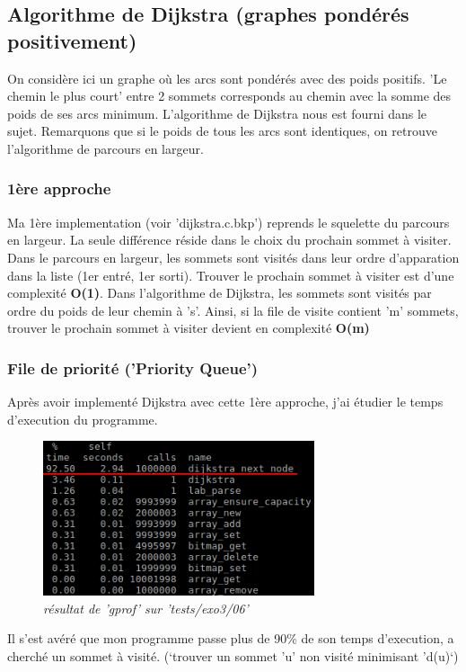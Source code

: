 \documentclass[a4paper,10pt]{article}
\begin{document}
  \subsection{Algorithme de Dijkstra (graphes pondérés positivement)}
    On considère ici un graphe où les arcs sont pondérés avec des poids positifs.\newline
    'Le chemin le plus court' entre 2 sommets corresponds au chemin avec la somme des poids de ses arcs minimum.\newline
     L'algorithme de Dijkstra nous est fourni dans le sujet. Remarquons que si le poids de tous les arcs sont identiques,
     on retrouve l'algorithme de parcours en largeur.
    \subsubsection{1ère approche}
      Ma 1ère implementation (voir 'dijkstra.c.bkp') reprends le squelette du parcours en largeur.
      La seule différence réside dans le choix du prochain sommet à visiter.\newline
      Dans le parcours en largeur, les sommets sont visités dans leur ordre d'apparation dans la liste (1er entré, 1er sorti).
      Trouver le prochain sommet à visiter est d'une complexité \textbf{O(1)}.\newline\newline
      Dans l'algorithme de Dijkstra, les sommets sont visités par ordre du poids de leur chemin à 's'.
      Ainsi, si la file de visite contient 'm' sommets, trouver le prochain sommet à visiter devient en complexité \textbf{O(m)}
      
    \subsubsection{File de priorité ('Priority Queue')}
      Après avoir implementé Dijkstra avec cette 1ère approche, j'ai étudier le temps d'execution du programme.\newline
     \begin{figure}[!h]
	\begin{center}
	  \includegraphics[width=8cm,height=\textheight,keepaspectratio]{./images/no_pqueue.png}
	\end{center}
	\caption{\textit{résultat de 'gprof' sur 'tests/exo3/06'}}
      \end{figure}
      Il s'est avéré que mon programme passe plus de 90\% de son temps d'execution, a cherché un sommet à visité.
      (`trouver un sommet 'u' non visité minimisant 'd(u)`)
\end{document}
